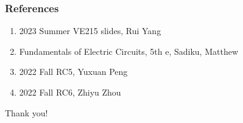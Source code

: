 \documentclass{beamer}
\begin{document}





\begin{frame}
\frametitle{References}
\begin{enumerate}
\item 2023 Summer VE215 slides, Rui Yang
\item Fundamentals of Electric Circuits, 5th e, Sadiku, Matthew
\item 2022 Fall RC5, Yuxuan Peng
\item 2022 Fall RC6, Zhiyu Zhou
\end{enumerate}
\end{frame}


\begin{frame}
\Huge{\centerline{Thank you!}}
\end{frame}
\end{document}
